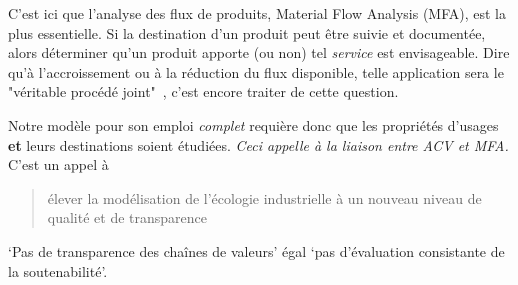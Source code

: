 C'est ici que l'analyse des flux de produits, Material Flow Analysis (MFA), est la plus essentielle.
Si la destination d'un produit peut être suivie et documentée, alors déterminer qu'un produit apporte (ou non) tel \emph{service} est envisageable.
Dire qu'à l’accroissement ou à la réduction du flux disponible, telle application sera le "véritable procédé joint"~\cite{european_commission_ilcd_2010}, c'est encore traiter de cette question.

Notre modèle pour son emploi \emph{complet} requière donc que les propriétés d'usages \textbf{et} leurs destinations soient étudiées.
\emph{Ceci appelle à la liaison entre ACV et MFA.}
C'est un appel à \blockcquote{pauliuk_lifting_2015}{élever la modélisation de l'écologie industrielle à un nouveau niveau de qualité et de transparence}.
`Pas de transparence des chaînes de valeurs' égal `pas d'évaluation consistante de la soutenabilité'.

